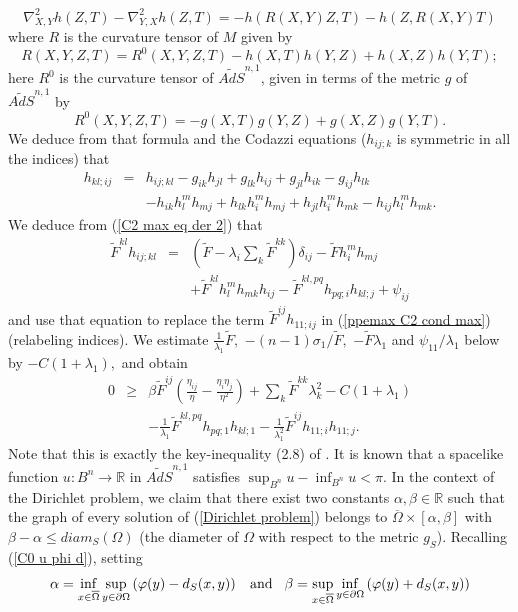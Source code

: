 \documentclass[10pt,reqno,oneside]{amsart}
\theoremstyle{definition}
\theoremstyle{remark}
\newcommand{\R}{\mathbb{R}}
\begin{document}
$$\nabla^2_{X,Y}h(Z,T)-\nabla^2_{Y,X}h(Z,T)=-h(R(X,Y)Z,T)-h(Z,R(X,Y)T)$$
where $R$ is the curvature tensor of $M$ given by
$$R(X,Y,Z,T)=R^0(X,Y,Z,T)-h(X,T)h(Y,Z)+h(X,Z)h(Y,T);$$
here $R^0$ is the curvature tensor of $\widetilde{AdS}^{n,1}$, given in terms of the metric $g$ of $\widetilde{AdS}^{n,1}$ by
$$R^0(X,Y,Z,T)=-g(X,T)g(Y,Z)+g(X,Z)g(Y,T).$$
We deduce from that formula and the Codazzi equations ($h_{ij;k}$ is symmetric in all the indices) that
\begin{eqnarray*}
h_{kl;ij}&=&h_{ij;kl}-g_{ik}h_{jl}+g_{lk}h_{ij}+g_{jl}h_{ik}-g_{ij}h_{lk}\\
&&-h_{ik}h^m_lh_{mj}+h_{lk}h_i^mh_{mj}+h_{jl}h_i^mh_{mk}-h_{ij}h^m_lh_{mk}.
\end{eqnarray*}
We deduce from (\ref{C2 max eq der 2}) that
\begin{eqnarray*}
\widetilde{F}^{kl}h_{ij;kl}&=&\left(\widetilde{F}-\lambda_i\sum_k\widetilde{F}^{kk}\right)\delta_{ij}-\widetilde{F}h_i^mh_{mj}\\
&&+\widetilde{F}^{kl}h^m_lh_{mk}h_{ij}-\widetilde{F}^{kl,pq}h_{pq;i}h_{kl;j}+\psi_{ij}
\end{eqnarray*}
and use that equation to replace the term $\widetilde{F}^{ij}h_{11;ij}$ in (\ref{ppemax C2 cond max}) (relabeling indices). We estimate $\frac{1}{\lambda_1}\widetilde{F},$ $-(n-1)\sigma_1/\widetilde{F},$ $-\widetilde{F}\lambda_1$ and $\psi_{11}/\lambda_1$ below by $-C(1+\lambda_1),$ and obtain 
\begin{eqnarray}
0&\geq& \beta \widetilde{F}^{ij}\left(\frac{\eta_{ij}}{\eta}-\frac{\eta_i\eta_j}{\eta^2}\right)+\sum_k\widetilde{F}^{kk}\lambda_k^2-C(1+\lambda_1)\label{ineg fin ppe max C2}\\
&&-\frac{1}{\lambda_1}\widetilde{F}^{kl,pq}h_{pq;1}h_{kl;1}-\frac{1}{\lambda_1^2}\widetilde{F}^{ij}h_{11;i}h_{11;j}.\nonumber
\end{eqnarray}
Note that this is exactly the key-inequality (2.8) of \cite{Ur}. It is known that a spacelike function $u:B^n\rightarrow\R$ in $\widetilde{AdS}^{n,1}$ satisfies $\sup_{B^n}u-\inf_{B^n}u<\pi$. In the context of the Dirichlet problem, we claim that there exist two constants $\alpha,\beta\in\R$ such that the graph of every solution of (\ref{Dirichlet problem}) belongs to $\overline{\Omega}\times[\alpha,\beta]$ with $\beta-\alpha\leq diam_S(\Omega)$ (the diameter of $\Omega$ with respect to the metric $g_S$). Recalling (\ref{C0 u phi d}), setting
$$\alpha=\inf_{x\in\overline{\Omega}}\sup_{y\in\partial\Omega}\left(\varphi(y)-d_S(x,y)\right)\hspace{.3cm}\mbox{and}\hspace{.3cm}\beta=\sup_{x\in\overline{\Omega}}\inf_{y\in\partial\Omega}\left(\varphi(y)+d_S(x,y)\right)$$
\end{document}
